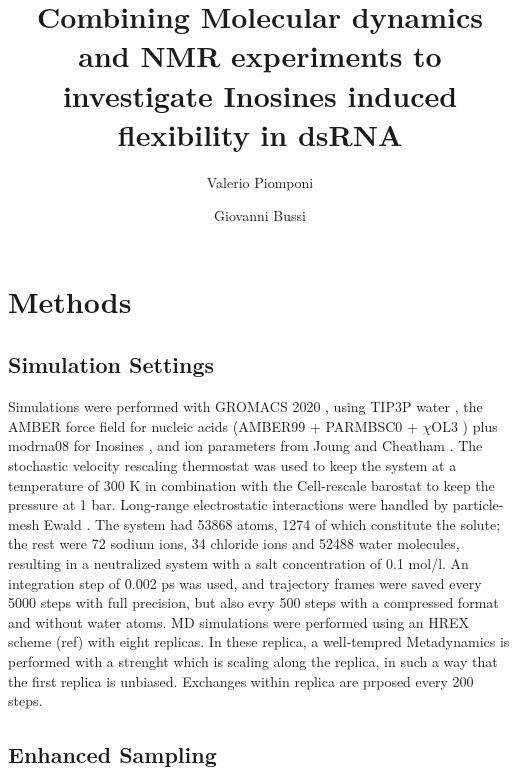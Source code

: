 \documentclass[paper]{article}
\begin{document}


\title{Combining Molecular dynamics and NMR experiments to investigate Inosines induced flexibility in dsRNA}

\author{Valerio Piomponi \and Giovanni Bussi}
\maketitle

\section{Methods}
\subsection{Simulation Settings}
Simulations were performed with GROMACS 2020 \citep{abraham2015gromacs}, using TIP3P water \citep{jorgensen1983comparison}, the AMBER force field for nucleic acids (AMBER99 + PARMBSC0 + $\chi$OL3 ) \cite{cornell1995second} \cite{perez2007refinement} \cite{zgarbova2011refinement} plus modrna08 for Inosines \cite{aduri2007amber}, and ion parameters from Joung and Cheatham \cite{joung2008determination}. The stochastic velocity rescaling thermostat \cite{bussi2007canonical} was used to keep the system at a temperature of 300 K in combination with the Cell-rescale \cite{bernetti2020pressure} barostat to keep the pressure at 1 bar. Long-range electrostatic interactions were handled by particle-mesh Ewald \cite{darden1993particle}. The system had 53868 atoms, 1274 of which constitute the solute; the rest were 72 sodium ions, 34 chloride ions and 52488 water molecules, resulting in a neutralized system with a salt concentration of 0.1 mol/l. 
An integration step of 0.002 ps was used, and trajectory frames were saved every 5000 steps with full precision, but also evry 500 steps with a compressed format and without water atoms.
MD simulations were performed using an HREX scheme (ref) with eight replicas. In these replica, a well-tempred Metadynamics is performed with a strenght which is scaling along the replica, in such a way that the first replica is unbiased. Exchanges within replica are prposed every 200 steps.



\subsection{Enhanced Sampling}
\end{document}
